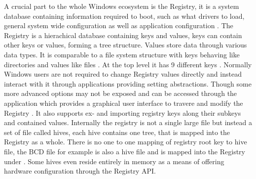 A crucial part to the whole Windows ecosystem is the Registry, it is a system database containing information required to boot, such as what drivers to load, general system wide configuration as well as application configuration \cite[Section 1]{windows-internals-7-part1}.
The Registry is a hierachical database containing keys and values, keys can contain other keys or values, forming a tree structure.
Values store data through various data types.
It is comparable to a file system structure with keys behaving like directories and values like files \cite[Section 10]{windows-internals-7-part2}.
At the top level it has 9 different keys \cite[Section 10]{windows-internals-7-part2}.
Normally Windows users are not required to change Registry values directly and instead interact with it through applications providing setting abstractions.
Though some more advanced options may not be exposed and can be accessed through the  application which provides a graphical user interface to travere and modify the Registry \cite[Section 10]{windows-internals-7-part2}.
It also supports ex- and importing registry keys along their subkeys and contained values.
Internally the registry is not a single large file but instead a set of file called hives, each hive contains one tree, that is mapped into the Registry as a whole.
There is no one to one mapping of registry root key to hive file, the \ac{BCD} file for example is also a hive file and is mapped into the Registry under  \cite[Section 10]{windows-internals-7-part2}.
Some hives even reside entirely in memory as a means of offering hardware configuration through the Registry \ac{API}.

